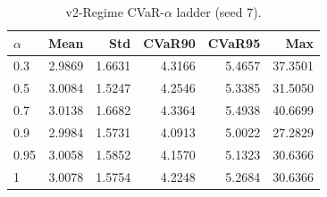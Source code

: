 \begin{table}[H]
    \centering
    \caption{v2-Regime CVaR-$\alpha$ ladder (seed 7).}
    \label{tab:v2_regime_alpha}
    \begin{tabular}{@{}lrrrrr@{}}
        \toprule
        $\alpha$ & Mean & Std & CVaR90 & CVaR95 & Max \\
        \midrule
        0.3 & 2.9869 & 1.6631 & 4.3166 & 5.4657 & 37.3501 \\
        0.5 & 3.0084 & 1.5247 & 4.2546 & 5.3385 & 31.5050 \\
        0.7 & 3.0138 & 1.6682 & 4.3364 & 5.4938 & 40.6699 \\
        0.9 & 2.9984 & 1.5731 & 4.0913 & 5.0022 & 27.2829 \\
        0.95 & 3.0058 & 1.5852 & 4.1570 & 5.1323 & 30.6366 \\
        1 & 3.0078 & 1.5754 & 4.2248 & 5.2684 & 30.6366 \\
        \bottomrule
    \end{tabular}
\end{table}
